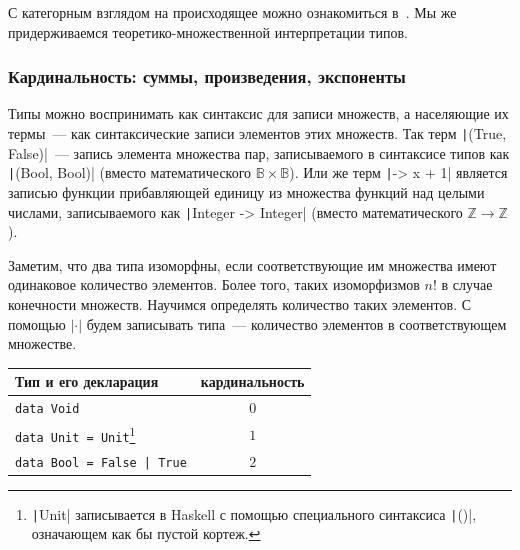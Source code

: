 С категорным взглядом на происходящее можно ознакомиться в~\cite{hinze2010reason}.
Мы же придерживаемся теоретико-множественной интерпретации типов.

\subsubsection{Кардинальность: суммы, произведения, экспоненты} \label{subsubsec:cardinality}

Типы можно воспринимать как синтаксис для записи множеств, а населяющие их термы~--- как синтаксические записи элементов этих множеств.
Так терм \texttt|(True, False)|~--- запись элемента множества пар, записываемого в синтаксисе типов как \texttt|(Bool, Bool)| (вместо математического $\mathbb{B}\times\mathbb{B}$).
Или же терм \texttt|\x -> x + 1| является записью функции прибавляющей единицу из множества функций над целыми числами, записываемого как \texttt|Integer -> Integer| (вместо математического $\mathbb{Z}\to\mathbb{Z}$).

Заметим, что два типа изоморфны, если соответствующие им множества имеют одинаковое количество элементов.
Более того, таких изоморфизмов $n!$ в случае конечности множеств.
Научимся определять количество таких элементов.
С помощью $|\cdot|$ будем записывать  типа~--- количество элементов в соответствующем множестве.

\begin{center}
    \begin{tabular}{|l|c|}
        \hline
        Тип и его декларация                                                                                                                                                                            & кардинальность \\
        \hline
        \texttt{data Void}                                                                                                                                                                 & $0$            \\
        \texttt{data Unit = Unit}\footnote{\texttt|Unit| записывается в Haskell с помощью специального синтаксиса \texttt|()|, означающем как бы пустой кортеж.} & $1$ \\
        \texttt{data Bool = False | True}                                                                                                                                                  & $2$            \\
        \hline
    \end{tabular}
\end{center}

